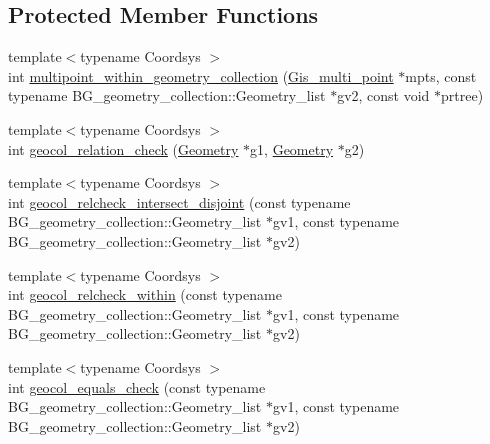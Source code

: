 \subsection*{Protected Member Functions}
\begin{DoxyCompactItemize}
\item 
{\footnotesize template$<$typename Coordsys $>$ }\\int \mbox{\hyperlink{classItem__func__spatial__rel_afcd44332f22226b07376c2823ff36be8}{multipoint\+\_\+within\+\_\+geometry\+\_\+collection}} (\mbox{\hyperlink{classGis__multi__point}{Gis\+\_\+multi\+\_\+point}} $\ast$mpts, const typename B\+G\+\_\+geometry\+\_\+collection\+::\+Geometry\+\_\+list $\ast$gv2, const void $\ast$prtree)
\item 
{\footnotesize template$<$typename Coordsys $>$ }\\int \mbox{\hyperlink{classItem__func__spatial__rel_abb5637f13eb30a9a0ef66e0f95f8eff9}{geocol\+\_\+relation\+\_\+check}} (\mbox{\hyperlink{classGeometry}{Geometry}} $\ast$g1, \mbox{\hyperlink{classGeometry}{Geometry}} $\ast$g2)
\item 
{\footnotesize template$<$typename Coordsys $>$ }\\int \mbox{\hyperlink{classItem__func__spatial__rel_abbfe9706f8754b71d6549026b5779f14}{geocol\+\_\+relcheck\+\_\+intersect\+\_\+disjoint}} (const typename B\+G\+\_\+geometry\+\_\+collection\+::\+Geometry\+\_\+list $\ast$gv1, const typename B\+G\+\_\+geometry\+\_\+collection\+::\+Geometry\+\_\+list $\ast$gv2)
\item 
{\footnotesize template$<$typename Coordsys $>$ }\\int \mbox{\hyperlink{classItem__func__spatial__rel_af5dcc784c0ad8eb99642f7c4b1bbf6a4}{geocol\+\_\+relcheck\+\_\+within}} (const typename B\+G\+\_\+geometry\+\_\+collection\+::\+Geometry\+\_\+list $\ast$gv1, const typename B\+G\+\_\+geometry\+\_\+collection\+::\+Geometry\+\_\+list $\ast$gv2)
\item 
{\footnotesize template$<$typename Coordsys $>$ }\\int \mbox{\hyperlink{classItem__func__spatial__rel_aaf0e2d4a1e08b50a044c8990fb2f4a82}{geocol\+\_\+equals\+\_\+check}} (const typename B\+G\+\_\+geometry\+\_\+collection\+::\+Geometry\+\_\+list $\ast$gv1, const typename B\+G\+\_\+geometry\+\_\+collection\+::\+Geometry\+\_\+list $\ast$gv2)
\end{DoxyCompactItemize}
